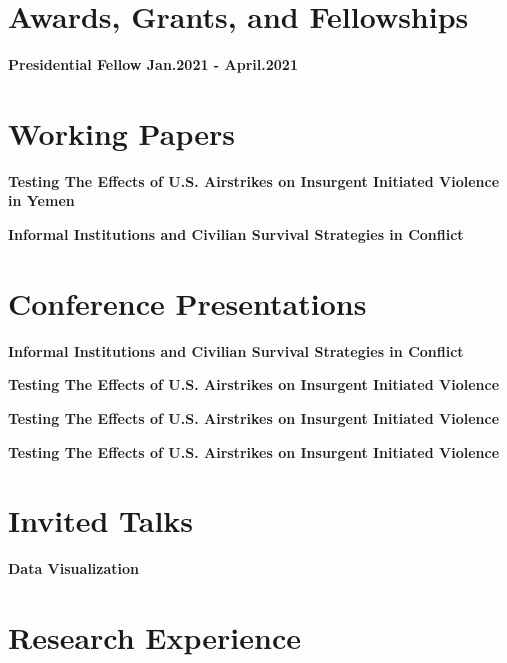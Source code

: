 \documentclass[margin]{res}
\newcommand{\fullhrulefill}{%
  \hspace*{-\sectionwidth}\hrulefill%
  }
\begin{document}
\begin{resume}
\section{Awards, Grants, and Fellowships}
\textbf {Presidential Fellow \hfill {Jan.2021 - April.2021 } \\ }

\fullhrulefill
\section{Working Papers}
\textbf {Testing The Effects of U.S. Airstrikes on Insurgent Initiated Violence in Yemen}

\textbf {Informal Institutions and Civilian Survival Strategies in Conflict}

\fullhrulefill
\section {Conference Presentations}


\textbf {Informal Institutions and Civilian Survival Strategies in Conflict \hfill  \\ }

\textbf {Testing The Effects of U.S. Airstrikes on Insurgent Initiated Violence \hfill  \\ }

\textbf {Testing The Effects of U.S. Airstrikes on Insurgent Initiated Violence \hfill  \\ }

\textbf {Testing The Effects of U.S. Airstrikes on Insurgent Initiated Violence \hfill \\ }

\fullhrulefill
\section{Invited Talks}

\textbf{Data Visualization \hfill \\}

\fullhrulefill
\section{ Research Experience}


\end{resume}
\end{document}
